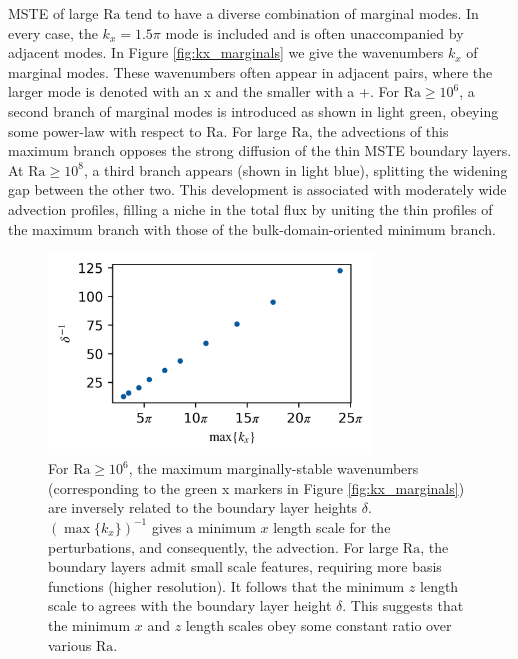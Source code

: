 \documentclass[reprint,amsmath,amssymb,aps]{revtex4-1}
\newcommand\Ra{\mathrm{Ra}}
\begin{document}
MSTE of large $\Ra$ tend to have a diverse combination of marginal modes.
In every case, the $k_x = 1.5\pi$ mode is included and is often unaccompanied by adjacent modes. 
In Figure \ref{fig:kx_marginals} we give the wavenumbers $k_x$ of marginal modes. 
These wavenumbers often appear in adjacent pairs, where the larger mode is denoted with an x and the smaller with a +. 
For $\Ra \geq 10^6$, a second branch of marginal modes is introduced as shown in light green, obeying some power-law with respect to $\Ra$. 
For large $\Ra$, the advections of this maximum branch opposes the strong diffusion of the thin MSTE boundary layers. 
At $\Ra \geq 10^8$, a third branch appears (shown in light blue), splitting the widening gap between the other two. 
This development is associated with moderately wide advection profiles, filling a niche in the total flux by uniting the thin profiles of the maximum branch with those of the bulk-domain-oriented minimum branch.

\begin{figure}
    \centering
    \includegraphics[width=3.4in]{del_kx_inv.png}
    \caption{For $\Ra \geq 10^6$, the maximum marginally-stable wavenumbers (corresponding to the green x markers in Figure \ref{fig:kx_marginals}) are inversely related to the boundary layer heights $\delta$. 
    $(\max \{ k_x \})^{-1}$ gives a minimum $x$ length scale for the perturbations, and consequently, the advection. 
    For large $\Ra$, the boundary layers admit small scale features, requiring more basis functions (higher resolution).
    It follows that the minimum $z$ length scale to agrees with the boundary layer height $\delta$. 
    This suggests that the minimum $x$ and $z$ length scales obey some constant ratio over various $\Ra$.}
    \label{fig:del_inv}
\end{figure}
\end{document}
